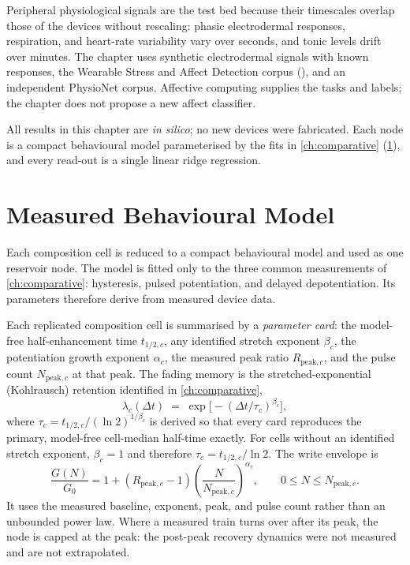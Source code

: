 \documentclass[12pt, twoside]{report}
\begin{document}
Peripheral physiological signals are the test bed because their timescales overlap those of the devices without rescaling: phasic electrodermal responses, respiration, and heart-rate variability vary over seconds, and tonic levels drift over minutes. The chapter uses synthetic electrodermal signals with known responses, the Wearable Stress and Affect Detection corpus (\WESAD{}), and an independent PhysioNet corpus. Affective computing supplies the tasks and labels; the chapter does not propose a new affect classifier.

All results in this chapter are \emph{in silico}; no new devices were fabricated. Each node is a compact behavioural model parameterised by the fits in \cref{ch:comparative} (\cref{sec:ch5_model}), and every read-out is a single linear ridge regression.

\section{Measured Behavioural Model}\label{sec:ch5_model}

Each composition cell is reduced to a compact behavioural model and used as one reservoir node. The model is fitted only to the three common measurements of \cref{ch:comparative}: hysteresis, pulsed potentiation, and delayed depotentiation. Its parameters therefore derive from measured device data.

Each replicated composition cell is summarised by a \emph{parameter card}: the model-free half-enhancement time $t_{1/2,c}$, any identified stretch exponent $\beta_c$, the potentiation growth exponent $\alpha_c$, the measured peak ratio $R_{\mathrm{peak},c}$, and the pulse count $N_{\mathrm{peak},c}$ at that peak. The fading memory is the stretched-exponential (Kohlrausch) retention identified in \cref{ch:comparative},
\[
  \lambda_c(\Delta t) \;=\; \exp\!\big[-(\Delta t/\tau_c)^{\beta_c}\big],
\]
where $\tau_c=t_{1/2,c}/(\ln 2)^{1/\beta_c}$ is derived so that every card reproduces the primary, model-free cell-median half-time exactly. For cells without an identified stretch exponent, $\beta_c=1$ and therefore $\tau_c=t_{1/2,c}/\ln 2$. The write envelope is
\[
  \frac{G(N)}{G_0}=1+(R_{\mathrm{peak},c}-1)
  \left(\frac{N}{N_{\mathrm{peak},c}}\right)^{\alpha_c},
  \qquad 0\leq N\leq N_{\mathrm{peak},c}.
\]
It uses the measured baseline, exponent, peak, and pulse count rather than an unbounded power law. Where a measured train turns over after its peak, the node is capped at the peak: the post-peak recovery dynamics were not measured and are not extrapolated.
\end{document}

